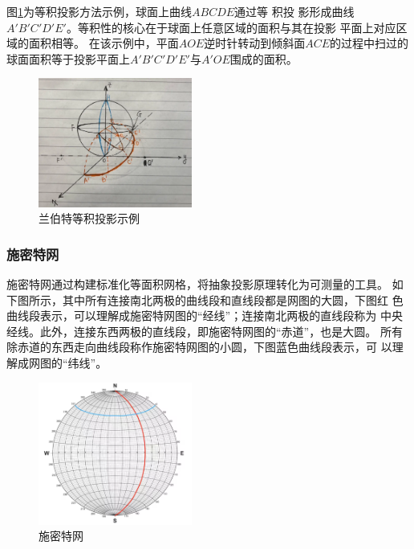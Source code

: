 \documentclass[a4paper,twoside]{ctexart}
\begin{document}
图\ref{fig:兰伯特等积投影}为等积投影方法示例，球面上曲线$ABCDE$通过等
积投
影形成曲线$A'B'C'D'E'$。等积性的核心在于球面上任意区域的面积与其在投影
平面上对应区域的面积相等。
在该示例中，平面$AOE$逆时针转动到倾斜面$ACE$的过程中扫过的
球面面积等于投影平面上$A'B'C'D'E'$与$A'OE$围成的面积。

\begin{figure}[htbp]
  \centering
    \includegraphics[width=0.45\textwidth]{pic/兰伯特等积投影.png}
  \caption{兰伯特等积投影示例}
  \label{fig:兰伯特等积投影}
\end{figure}

\subsubsection{施密特网}

施密特网通过构建标准化等面积网格，将抽象投影原理转化为可测量的工具。
如下图所示，其中所有连接南北两极的曲线段和直线段都是网图的大圆，下图红
色曲线段表示，可以理解成施密特网图的“经线”；连接南北两极的直线段称为
中央经线。此外，连接东西两极的直线段，即施密特网图的“赤道”，也是大圆。
所有除赤道的东西走向曲线段称作施密特网图的小圆，下图蓝色曲线段表示，可
以理解成网图的“纬线”。

\begin{figure}[htbp]
  \centering
    \includegraphics[width=0.45\textwidth]{pic/施密特网.png}
  \caption{施密特网}
  \label{fig:施密特网}
\end{figure}
\end{document}
